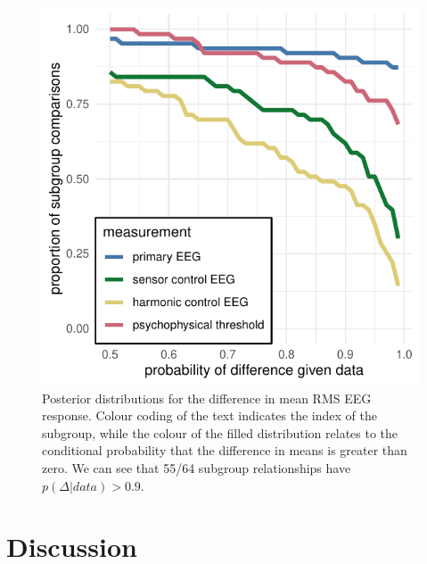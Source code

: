 \documentclass[9pt,twocolumn,twoside,lineno]{pnas-new}
\begin{document}
\begin{figure}%
\centering
\includegraphics[width=1\linewidth]{../analysis/plots/model_roc_style.pdf}
\caption{Posterior distributions for the difference in mean RMS EEG response. Colour coding of the text indicates the index of the subgroup, while the colour of the filled distribution relates to the conditional probability that the difference in means is greater than zero. We can see that 55/64 subgroup relationships have $p(\Delta|data)>0.9$.}
\label{fig:durations_rotations}
\end{figure}


\section*{Discussion}
\end{document}
